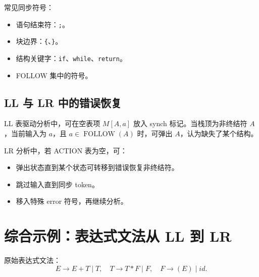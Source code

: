 \documentclass[UTF8,fontset=none,11pt]{ctexart}
\newcommand{\FOLLOW}{\operatorname{FOLLOW}}
\begin{document}
\begin{center}
\end{center}

常见同步符号：

\begin{itemize}
  \item 语句结束符：\texttt{;}。
  \item 块边界：\texttt{\{}、\texttt{\}}。
  \item 结构关键字：\texttt{if}、\texttt{while}、\texttt{return}。
  \item FOLLOW 集中的符号。
\end{itemize}

\subsection{LL 与 LR 中的错误恢复}

LL 表驱动分析中，可在空表项 \(M[A,a]\) 放入 synch 标记。当栈顶为非终结符 \(A\)，当前输入为 \(a\)，且 \(a\in\FOLLOW(A)\) 时，可弹出 \(A\)，认为缺失了某个结构。

LR 分析中，若 ACTION 表为空，可：

\begin{itemize}
  \item 弹出状态直到某个状态可转移到错误恢复非终结符。
  \item 跳过输入直到同步 token。
  \item 移入特殊 error 符号，再继续分析。
\end{itemize}

\section{综合示例：表达式文法从 LL 到 LR}

原始表达式文法：
\[
E\to E+T\mid T,\quad T\to T*F\mid F,\quad F\to (E)\mid id.
\]
\end{document}
